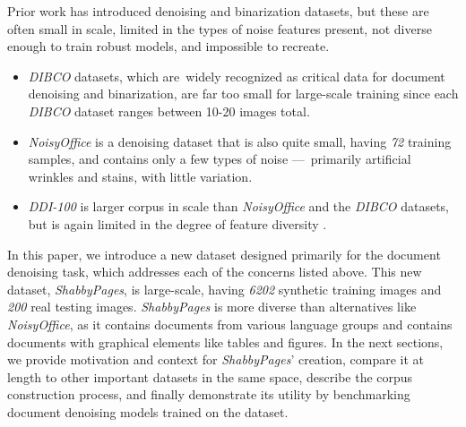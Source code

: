 \documentclass[runningheads]{llncs}
\begin{document}
Prior work has introduced denoising and binarization datasets, but these are often small in scale, limited in the types of noise features present, not diverse enough to train robust models, and impossible to recreate.
\begin{itemize}
\item \emph{DIBCO} datasets, which are widely recognized as critical data for document denoising and binarization, are far too small for large-scale training since each \emph{DIBCO} dataset ranges between 10-20 images total.
\item \emph{NoisyOffice} \cite{ref_NoisyOfficeDatabase} is a denoising dataset that is also quite small, having \emph{72} training samples, and contains only a few types of noise — primarily artificial wrinkles and stains, with little variation.
\item \emph{DDI-100} \cite{ddi-100-2019} is larger corpus in scale than \emph{NoisyOffice} and the \emph{DIBCO} datasets, but is again limited in the degree of feature diversity \cite{detection-masking-2022}.
\end{itemize}

In this paper, we introduce a new dataset designed primarily for the document denoising task, which addresses each of the concerns listed above.
This new dataset, \emph{ShabbyPages}, is large-scale, having \emph{6202} synthetic training images and \emph{200} real testing images.
\emph{ShabbyPages} is more diverse than alternatives like \emph{NoisyOffice}, as it contains documents from various language groups and contains documents with graphical elements like tables and figures.
In the next sections, we provide motivation and context for \emph{ShabbyPages}' creation, compare it at length to other important datasets in the same space, describe the corpus construction process, and finally demonstrate its utility by benchmarking document denoising models trained on the dataset.
\end{document}
